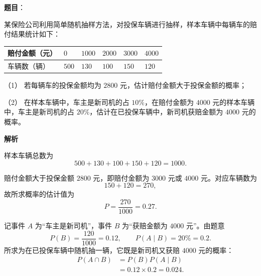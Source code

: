 \begin{answer}

\textbf{题目}：

某保险公司利用简单随机抽样方法，对投保车辆进行抽样，样本车辆中每辆车的赔付结果统计如下：

\begin{center}
\begin{tabular}{llllll}
\toprule
赔付金额（元） & $0$ & $1000$ & $2000$ & $3000$ & $4000$ \\
\midrule
车辆数（辆） & $500$ & $130$ & $100$ & $150$ & $120$ \\
\bottomrule
\end{tabular}
\end{center}

（1） 若每辆车的投保金额均为 $2800$ 元，估计赔付金额大于投保金额的概率；

（2） 在样本车辆中，车主是新司机的占 $10\%$，在赔付金额为 $4000$ 元的样本车辆中，车主是新司机的占 $20\%$，估计在已投保车辆中，新司机获赔金额为 $4000$ 元的概率。

\textbf{解析}

样本车辆总数为
\nopagebreak[4]
\[500+130+100+150+120=1000.\]


赔付金额大于投保金额 $2800$ 元，即赔付金额为 $3000$ 元或 $4000$ 元。对应车辆数为
\nopagebreak[4]
\[150+120=270,\]
故所求概率的估计值为
\nopagebreak[4]
\[P=\frac{270}{1000}=0.27.\]


记事件 $A$ 为“车主是新司机”，事件 $B$ 为“获赔金额为 $4000$ 元”。由题意
\nopagebreak[4]
\[P(B)=\frac{120}{1000}=0.12,\qquad P(A\mid B)=20\%=0.2.\]
所求为在已投保车辆中随机抽一辆，它既是新司机又获赔 $4000$ 元的概率：
\nopagebreak[4]
\[\begin{aligned}
P(A\cap B)&=P(B)P(A\mid B)\\
&=0.12\times0.2=0.024.
\end{aligned}\]



\end{answer}
